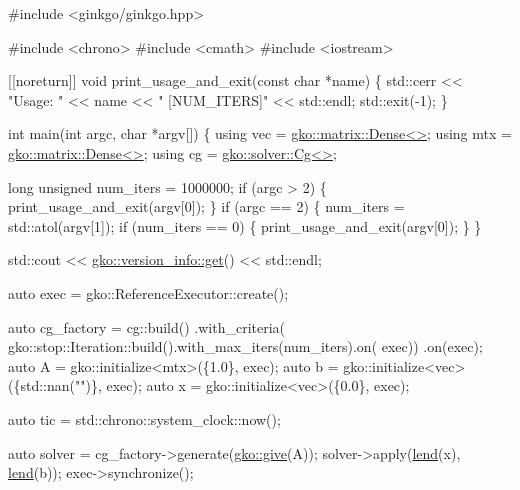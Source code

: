 \begin{DoxyCode}
\textcolor{preprocessor}{#include <ginkgo/ginkgo.hpp>}


\textcolor{preprocessor}{#include <chrono>}
\textcolor{preprocessor}{#include <cmath>}
\textcolor{preprocessor}{#include <iostream>}


[[noreturn]] \textcolor{keywordtype}{void} print\_usage\_and\_exit(\textcolor{keyword}{const} \textcolor{keywordtype}{char} *name) \{
    std::cerr << \textcolor{stringliteral}{"Usage: "} << name << \textcolor{stringliteral}{" [NUM\_ITERS]"} << std::endl;
    std::exit(-1);
\}


\textcolor{keywordtype}{int} main(\textcolor{keywordtype}{int} argc, \textcolor{keywordtype}{char} *argv[])
\{
    \textcolor{keyword}{using} vec = \hyperlink{classgko_1_1matrix_1_1Dense}{gko::matrix::Dense<>};
    \textcolor{keyword}{using} mtx = \hyperlink{classgko_1_1matrix_1_1Dense}{gko::matrix::Dense<>};
    \textcolor{keyword}{using} cg = \hyperlink{classgko_1_1solver_1_1Cg}{gko::solver::Cg<>};

    \textcolor{keywordtype}{long} \textcolor{keywordtype}{unsigned} num\_iters = 1000000;
    \textcolor{keywordflow}{if} (argc > 2) \{
        print\_usage\_and\_exit(argv[0]);
    \}
    \textcolor{keywordflow}{if} (argc == 2) \{
        num\_iters = std::atol(argv[1]);
        \textcolor{keywordflow}{if} (num\_iters == 0) \{
            print\_usage\_and\_exit(argv[0]);
        \}
    \}

    std::cout << \hyperlink{classgko_1_1version__info_a6daeb8a087cfb57fa055526fc133d8eb}{gko::version\_info::get}() << std::endl;

    \textcolor{keyword}{auto} exec = gko::ReferenceExecutor::create();

    \textcolor{keyword}{auto} cg\_factory =
        cg::build()
            .with\_criteria(
                gko::stop::Iteration::build().with\_max\_iters(num\_iters).on(
                    exec))
            .on(exec);
    \textcolor{keyword}{auto} A = gko::initialize<mtx>(\{1.0\}, exec);
    \textcolor{keyword}{auto} b = gko::initialize<vec>(\{std::nan(\textcolor{stringliteral}{""})\}, exec);
    \textcolor{keyword}{auto} x = gko::initialize<vec>(\{0.0\}, exec);

    \textcolor{keyword}{auto} tic = std::chrono::system\_clock::now();

    \textcolor{keyword}{auto} solver = cg\_factory->generate(\hyperlink{namespacegko_acbd3fd6d07e498892881e8e2ab0b4167}{gko::give}(A));
    solver->apply(\hyperlink{namespacegko_aa8cb4876b72e5e1036ea9575443c439b}{lend}(x), \hyperlink{namespacegko_aa8cb4876b72e5e1036ea9575443c439b}{lend}(b));
    exec->synchronize();


\end{DoxyCode}
